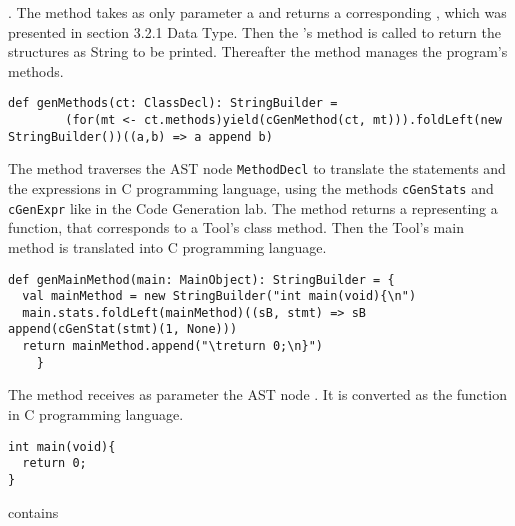 \lstset{style=customscala}{\lstinline[basicstyle=\small\ttfamily]|def genStructDef(ct: ClassDecl): StructDef|}.
The method takes as only parameter a \lstset{style=customc}{\lstinline[basicstyle=\small\ttfamily]|ClassDecl|}
and returns a corresponding \lstset{style=customc}{\lstinline[basicstyle=\small\ttfamily]|StructDef|},
which was presented in section 3.2.1 Data Type. Then the \lstset{style=customc}{\lstinline[basicstyle=\small\ttfamily]|StructDef|}'s method
\lstset{style=customc}{\lstinline[basicstyle=\small\ttfamily]|toStringRepr|} is called to return the structures as String to be printed.
\newline
Thereafter the method manages the program's methods.
\lstset{style=customscala}
\begin{lstlisting}
def genMethods(ct: ClassDecl): StringBuilder =
        (for(mt <- ct.methods)yield(cGenMethod(ct, mt))).foldLeft(new StringBuilder())((a,b) => a append b)
\end{lstlisting}
The method \lstset{style=customc}{\lstinline[basicstyle=\small\ttfamily]|cGenMethod|} traverses the AST node\newline
{\lstinline[basicstyle=\small\ttfamily]|MethodDecl|} to translate the statements and the expressions
in C programming language, using the methods {\lstinline[basicstyle=\small\ttfamily]|cGenStats|} and
{\lstinline[basicstyle=\small\ttfamily]|cGenExpr|} like in the Code Generation lab.
The method returns a \lstset{style=customc}{\lstinline[basicstyle=\small\ttfamily]|StringBuilder|}
representing a function, that corresponds to a Tool's class method.
\newline
Then the Tool's main method is translated into C programming language.
\lstset{style=customscala}\begin{lstlisting}
def genMainMethod(main: MainObject): StringBuilder = {
  val mainMethod = new StringBuilder("int main(void){\n")
  main.stats.foldLeft(mainMethod)((sB, stmt) => sB append(cGenStat(stmt)(1, None)))
  return mainMethod.append("\treturn 0;\n}")
    }
\end{lstlisting}
The \lstset{style=customc}{\lstinline[basicstyle=\small\ttfamily]|genMainMethod|} method receives
as parameter the AST node \lstset{style=customc}{\lstinline[basicstyle=\small\ttfamily]|MainObject|}.
It is converted as the \lstset{style=customc}{\lstinline[basicstyle=\small\ttfamily]|main|} function in C programming language.
\begin{lstlisting}
int main(void){
  return 0;
}
\end{lstlisting}
\lstset{style=customc}{\lstinline[basicstyle=\small\ttfamily]|MainObject|} contains
